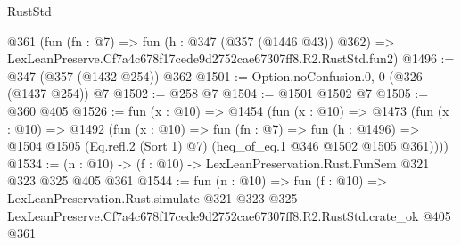 \begin{lexlean}{RustStd}
\begin{coremodule}
    @361
    (fun (fn : @7) =>
    fun (h : @347 (@357 (@1446 @43)) @362) =>
    LexLeanPreserve.Cf7a4c678f17cede9d2752cae67307ff8.R2.RustStd.fun2)
@1496 := @347 (@357 (@1432 @254)) @362
@1501 := Option.noConfusion.{0, 0} (@326 (@1437 @254)) @7
@1502 := @258 @7
@1504 := @1501 @1502 @7
@1505 := @360 @405
@1526 := fun (x : @10) =>
  @1454
    (fun (x : @10) =>
    @1473
      (fun (x : @10) =>
      @1492
        (fun (x : @10) =>
        fun (fn : @7) =>
        fun (h : @1496) =>
        @1504 @1505 (Eq.refl.{2} (Sort 1) @7) (heq_of_eq.{1} @346 @1502 @1505 @361))))
@1534 := (n : @10) -> (f : @10) -> LexLeanPreservation.Rust.FunSem @321 @323 @325 @405 @361
@1544 := fun (n : @10) =>
  fun (f : @10) =>
  LexLeanPreservation.Rust.simulate
    @321
    @323
    @325
    LexLeanPreserve.Cf7a4c678f17cede9d2752cae67307ff8.R2.RustStd.crate_ok
    @405
    @361
\end{coremodule}
\end{lexlean}
